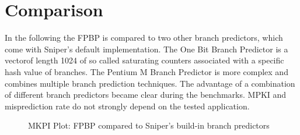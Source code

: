 \documentclass{article}
\begin{document}
\section{Comparison}
In the following the FPBP is compared to two other branch predictors, which come with Sniper's\cite{carlson2014aeohmcm} default implementation. 
The One Bit Branch Predictor is a vectorof length 1024 of so called saturating counters associated with a specific hash value of branches. 
The Pentium M Branch Predictor is more complex and combines multiple branch prediction techniques. The advantage of a combination of different branch predictors became clear during the benchmarks. MPKI and misprediction rate do not strongly depend on the tested application.
\begin{figure}[H]
\caption{MKPI Plot: FPBP compared to Sniper's\cite{carlson2014aeohmcm} build-in branch predictors}
\end{figure}
\end{document}
